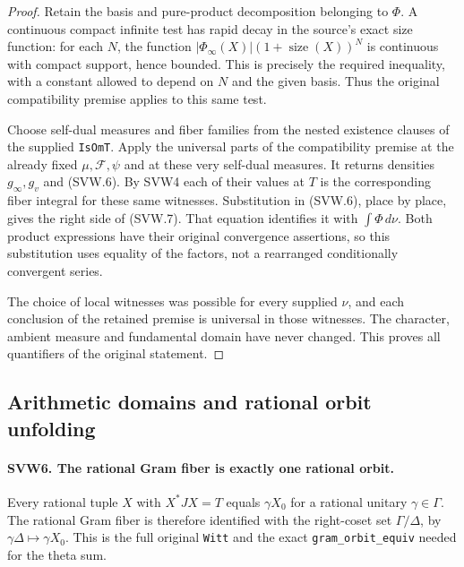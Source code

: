 \begin{proof}
Retain the basis and pure-product decomposition belonging to
$\Phi$.  A continuous compact infinite test has rapid decay in the
source's exact size function: for each $N$, the function
$|\Phi_\infty(X)|(1+\operatorname{size}(X))^N$ is continuous with
compact support, hence bounded.  This is precisely the required
inequality, with a constant allowed to depend on $N$ and the given
basis.  Thus the original compatibility premise applies to this
same test.

Choose self-dual measures and fiber families from the nested
existence clauses of the supplied \texttt{IsOmT}.  Apply the
universal parts of the compatibility premise at the already fixed
$\mu,\mathcal F,\psi$ and at these very self-dual measures.  It
returns densities $g_\infty,g_v$ and (SVW.6).  By SVW4 each of their
values at $T$ is the corresponding fiber integral for these same
witnesses.  Substitution in (SVW.6), place by place, gives the right
side of (SVW.7).  That equation identifies it with $\int\Phi\,d\nu$.
Both product expressions have their original convergence assertions,
so this substitution uses equality of the factors, not a rearranged
conditionally convergent series.

The choice of local witnesses was possible for every supplied
$\nu$, and each conclusion of the retained premise is universal
in those witnesses.  The character, ambient measure and fundamental
domain have never changed.  This proves all quantifiers of the
original statement.
\end{proof}

\subsection{Arithmetic domains and rational orbit unfolding}

\paragraph{SVW6. The rational Gram fiber is exactly one rational orbit.}
\label{claim:SVW6}
Every rational tuple $X$ with $X^*JX=T$ equals $\gamma X_0$ for a
rational unitary $\gamma\in\Gamma$.  The rational Gram fiber is
therefore identified with the right-coset set $\Gamma/\Delta$,
by $\gamma\Delta\mapsto\gamma X_0$.  This is the full original
\texttt{Witt} and the exact \texttt{gram\_orbit\_equiv} needed for
the theta sum.


